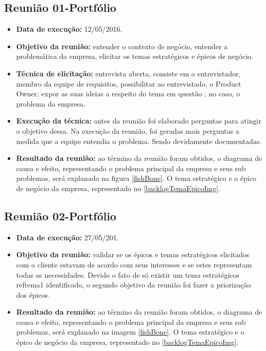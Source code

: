 \subsection{Reunião 01-Portfólio}\label{Reunião01-Portfólio}
\begin{itemize}
\item \textbf{Data de execução:}
12/05/2016.
\item \textbf{Objetivo da reunião:}
entender o contexto de negócio, entender a problemática da empresa, elicitar os temas estratégicos e épicos de negócio.
\item \textbf{Técnica de elicitação:}
entrevista aberta, consiste em o entrevistador, membro da equipe de requisitos, possibilitar ao entrevistado, o Product Owner, expor as suas ideias a respeito do tema em questão \cite{leffingwell2011}, no caso, o problema da empresa.
\item \textbf{Execução da técnica:}
antes da reunião foi elaborado perguntas para atingir o objetivo dessa. Na execução da reunião, foi geradas mais perguntas a medida que a equipe entendia o problema. Sendo devidamente documentadas.
\item \textbf{Resultado da reunião:}
ao término da reunião foram obtidos, o diagrama de causa e efeito, representando o problema principal da empresa e seus sub problemas, será explanado na figura \ref{fishBone}. O tema estratégico e o épico de negócio da empresa, representado no \ref{backlogTemaEpicoImg}.
\end{itemize}

\subsection{Reunião 02-Portfólio}\label{Reunião02-Portfólio}
\begin{itemize}
\item \textbf{Data de execução:}
27/05/201.
\item \textbf{Objetivo da reunião:}
validar se os épicos e temas estratégicos elicitados com o cliente estavam de acordo com seus interesses e se estes representam todas as necessidades. Devido o fato de só existir um tema estratégicos ref{tema1} identificado, o segundo objetivo da reunião foi fazer a priorização dos épicos.
\item \textbf{Resultado da reunião:}
ao término da reunião foram obtidos, o diagrama de causa e efeito, representando o problema principal da empresa e seus sub problemas, será explanado na imagem \ref{fishBone}. O tema estratégico e o épico de negócio da empresa, representado no \ref{backlogTemaEpicoImg}.
\end{itemize}

